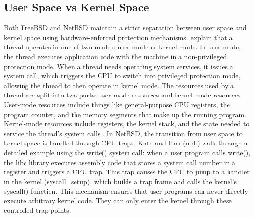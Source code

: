 \subsection{User Space vs Kernel Space}
Both FreeBSD and NetBSD maintain a strict separation between user space and kernel space using hardware-enforced protection mechanisms. \textcite{watson2015} explain that a thread operates in one of two modes: user mode or kernel mode. In user mode, the thread executes application code with the machine in a non-privileged protection mode. When a thread needs operating system services, it issues a system call, which triggers the CPU to switch into privileged protection mode, allowing the thread to then operate in kernel mode. The resources used by a thread are split into two parts: user-mode resources and kernel-mode resources. User-mode resources include things like general-purpose CPU registers, the program counter, and the memory segments that make up the running program. Kernel-mode resources include registers, the kernel stack, and the state needed to service the thread's system calls \parencite{watson2015}.
In NetBSD, the transition from user space to kernel space is handled through CPU traps. Kato and Itoh (n.d.) walk through a detailed example using the write() system call: when a user program calls write(), the libc library executes assembly code that stores a system call number in a register and triggers a CPU trap. This trap causes the CPU to jump to a handler in the kernel (syscall\_setup), which builds a trap frame and calls the kernel's syscall() function. This mechanism ensures that user programs can never directly execute arbitrary kernel code. They can only enter the kernel through these controlled trap points.

